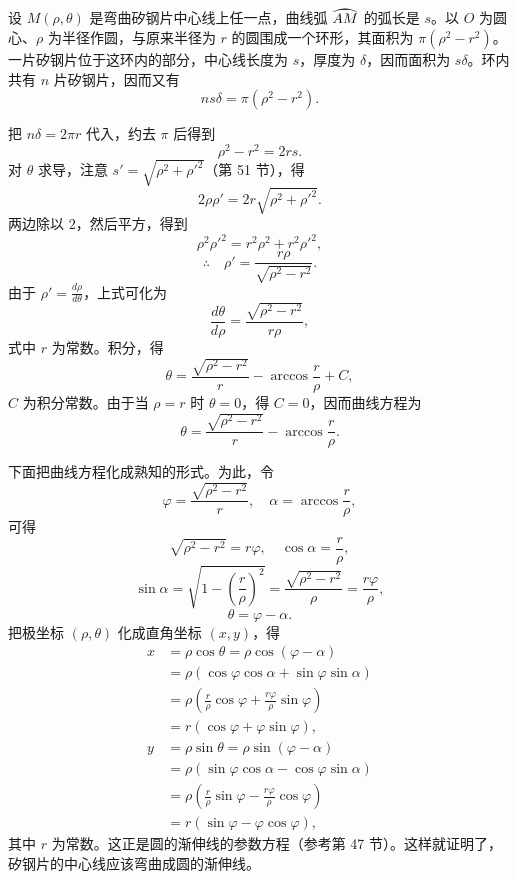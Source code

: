 \hfill
\begin{minipage}[c]{0.51\textwidth}
\hspace*{2em}设 $M(\rho,\theta)$ 是弯曲矽钢片中心线上任一点，曲线弧 $\arc{AM}$ 的弧长是 $s$。以 $O$ 为圆心、$\rho$ 为半径作圆，与原来半径为 $r$ 的圆围成一个环形，其面积为 $\pi(\rho^2 - r^2)$。一片矽钢片位于这环内的部分，中心线长度为 $s$，厚度为 $\delta$，因而面积为 $s\delta$。环内共有 $n$ 片矽钢片，因而又有
\[
  ns\delta = \pi(\rho^2 - r^2).
\]
\end{minipage}
把 $n\delta = 2\pi r$ 代入，约去 $\pi$ 后得到
\[
  \rho^2 - r^2 = 2rs.
\]
对 $\theta$ 求导，注意 $s' = \sqrt{\rho^2 + \rho'^2}$（第 51 节），得
\[
  2\rho\rho' = 2r\sqrt{\rho^2 + \rho'^2}.
\]
两边除以 $2$，然后平方，得到
\[
  \rho^2\rho'^2 = r^2\rho^2 + r^2\rho'^2,
\]
\[
  \therefore\quad \rho' = \frac{r\rho}{\sqrt{\rho^2 - r^2}}.
\]
由于 $\rho' = \frac{d\rho}{d\theta}$，上式可化为
\[
  \frac{d\theta}{d\rho} = \frac{\sqrt{\rho^2 - r^2}}{r\rho},
\]
式中 $r$ 为常数。积分，得
\[
  \theta = \frac{\sqrt{\rho^2 - r^2}}{r} - \arccos\frac{r}{\rho} + C,
\]
$C$ 为积分常数。由于当 $\rho = r$ 时 $\theta = 0$，得 $C = 0$，因而曲线方程为
\[
  \theta = \frac{\sqrt{\rho^2 - r^2}}{r} - \arccos\frac{r}{\rho}.
\]

下面把曲线方程化成熟知的形式。为此，令
\[
  \varphi = \frac{\sqrt{\rho^2 - r^2}}{r},\quad \alpha = \arccos\frac{r}{\rho},
\]
可得
\[
  \sqrt{\rho^2 - r^2} = r\varphi,\quad \cos\alpha = \frac{r}{\rho},
\]
\[
  \sin\alpha = \sqrt{1 - \left(\frac{r}{\rho}\right)^2} = \frac{\sqrt{\rho^2 - r^2}}{\rho} = \frac{r\varphi}{\rho},
\]
\[
  \theta = \varphi - \alpha.
\]
把极坐标 $(\rho,\theta)$ 化成直角坐标 $(x,y)$，得
\begin{align*}
  x &= \rho\cos\theta = \rho\cos(\varphi - \alpha) \\
    &= \rho(\cos\varphi\cos\alpha + \sin\varphi\sin\alpha) \\
    &= \rho\left(\frac{r}{\rho}\cos\varphi + \frac{r\varphi}{\rho}\sin\varphi\right) \\
    &= r(\cos\varphi + \varphi\sin\varphi), \\
  y &= \rho\sin\theta = \rho\sin(\varphi - \alpha) \\
    &= \rho(\sin\varphi\cos\alpha - \cos\varphi\sin\alpha) \\
    &= \rho\left(\frac{r}{\rho}\sin\varphi - \frac{r\varphi}{\rho}\cos\varphi\right) \\
    &= r(\sin\varphi - \varphi\cos\varphi),
\end{align*}
其中 $r$ 为常数。这正是圆的渐伸线的参数方程（参考第 47 节）。这样就证明了，矽钢片的中心线应该弯曲成圆的渐伸线。
